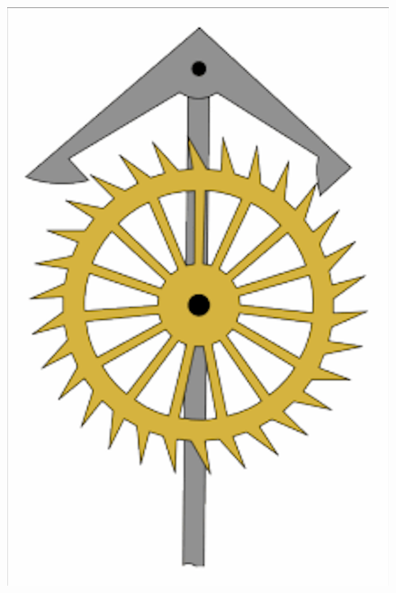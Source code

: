 \begin{figure}[htb]
\includegraphics[trim=2 2 2 2,clip,scale=0.3]{./Bilder/Anker_18.png}

\end{figure}
